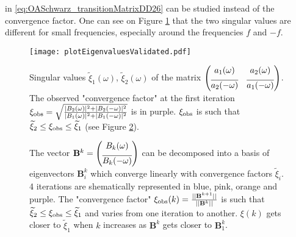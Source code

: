 in \eqref{eq:OASchwarz_transitionMatrixDD26}
can be studied instead of the convergence factor.
One can see on Figure \ref{fig:OASchwarz_singularValues} that
the two singular values are different for small frequencies,
especially around the frequencies $f$ and $-f$.
\begin{figure}
    \centering
    \texttt{[image: plotEigenvaluesValidated.pdf]}
	\caption{Singular values $\widetilde{\xi}_1(\omega)$,
	$\widetilde{\xi}_2(\omega)$ of the matrix $\begin{pmatrix}
	a_1(\omega) & a_2(\omega) \vspace{0.15cm}\\
	\overline{a_2(-\omega)} & \overline{a_1(-\omega)} \\
	\end{pmatrix}$.
	The observed "convergence factor" at the first
	iteration ${\xi}_{\rm obs} = \sqrt{\frac{|B_2(\omega)|^2 +
	|B_2(-\omega)|^2}{|B_{1}(\omega)|^2
	+ |B_{1}(-\omega)|^2}}$
	is in purple. ${\xi}_{\rm obs}$ is such that
	$\widetilde{\xi}_2 \leq {\xi}_{\rm obs}
	\leq\widetilde{\xi}_1$ (see Figure
	\ref{fig:OASchwarz_rateBetweenEigenvalues}).
	}
    \label{fig:OASchwarz_singularValues}
\end{figure}
\begin{figure}[htpb]
	\centering
	\caption[The convergence factor $\xi(k)$ varies and is bounded]{
	The vector
	$\mathbf{B}^k= \begin{pmatrix} B_k(\omega) \vspace{0.15cm}\\
	\overline{B_k(-\omega)} \end{pmatrix}$
	can be decomposed into a basis\footnotemark
	of eigenvectors
	$\mathbf{B}_i^k$ which converge linearly with
	convergence factors $\widetilde{\xi}_i$.
	4 iterations are shematically represented in blue, pink,
	orange and purple. The "convergence factor"
	$\xi_{\rm obs}(k)=\frac{||\mathbf{B}^{k+1}||}{||\mathbf{B}^{k}||}$
	is such that
	$\widetilde{\xi}_2 \leq \xi_{\rm obs} \leq \widetilde{\xi}_1$ and
	varies from one iteration to another. $\xi(k)$
	gets closer to $\widetilde{\xi}_1$ when $k$ increases as
	$\mathbf{B}^k$ gets closer to $\mathbf{B}^k_1$.
	}
	\label{fig:OASchwarz_rateBetweenEigenvalues}
\end{figure}
